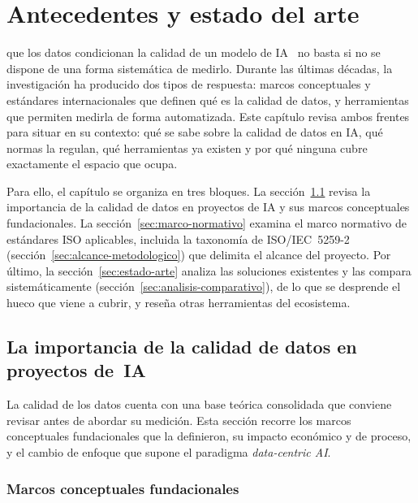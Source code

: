 \chapter{Antecedentes y estado del arte}
\label{chap:antecedentes}

 que los datos condicionan la calidad de un modelo de \ac{IA}~\citep{sambasivan2021, ng2021datacentric}
no basta si no se dispone de una forma sistemática de medirlo.  Durante las
últimas décadas, la investigación ha producido dos tipos de respuesta: marcos
conceptuales y estándares internacionales que definen qué es la calidad de
datos, y herramientas que permiten medirla de forma automatizada.  Este capítulo
revisa ambos frentes para situar \dataqual en su contexto: qué se sabe sobre
la calidad de datos en \ac{IA}, qué normas la regulan, qué herramientas ya
existen y por qué ninguna cubre exactamente el espacio que \dataqual ocupa.

Para ello, el capítulo se organiza en tres bloques.  La
sección~\ref{sec:importancia-calidad} revisa la importancia de la calidad de
datos en proyectos de \ac{IA} y sus marcos conceptuales fundacionales.  La
sección~\ref{sec:marco-normativo} examina el marco normativo de estándares
\ac{ISO} aplicables, incluida la taxonomía de \ac{ISO}/\ac{IEC}~5259-2
(sección~\ref{sec:alcance-metodologico}) que delimita el alcance del proyecto.
Por último, la sección~\ref{sec:estado-arte} analiza las soluciones
existentes y las compara sistemáticamente
(sección~\ref{sec:analisis-comparativo}), de lo que se desprende el hueco que
\dataqual viene a cubrir, y reseña otras herramientas del ecosistema.


\section[Importancia de la calidad de datos en IA]{La importancia de la calidad de datos en proyectos de~\ac{IA}}
\label{sec:importancia-calidad}

La calidad de los datos cuenta con una base teórica consolidada que conviene
revisar antes de abordar su medición.  Esta sección recorre los marcos
conceptuales fundacionales que la definieron, su impacto económico y de
proceso, y el cambio de enfoque que supone el paradigma
\emph{data-centric AI}.

\subsection{Marcos conceptuales fundacionales}

